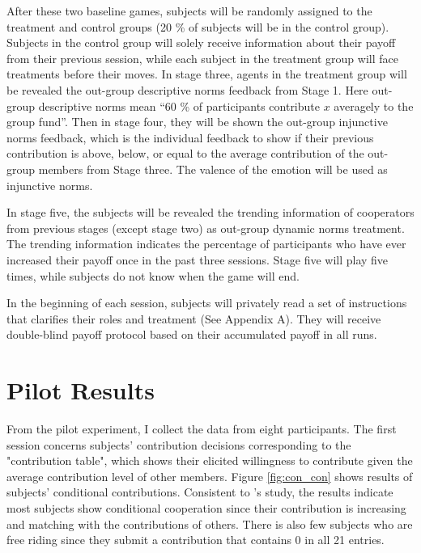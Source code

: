 \documentclass[12pt]{article}
\begin{document}
After these two baseline games, subjects will be randomly assigned to the treatment and control groups (20 \% of subjects will be in the control group). Subjects in the control group will solely receive information about their payoff from their previous session, while each subject in the treatment group will face treatments before their moves. In stage three, agents in the treatment group will be revealed the out-group descriptive norms feedback from Stage 1. Here out-group descriptive norms mean “60 \% of participants contribute $x$ averagely to the group fund”. Then in stage four, they will be shown the out-group injunctive norms feedback, which is the individual feedback to show if their previous contribution is above, below, or equal to the average contribution of the out-group members from Stage three. The valence of the emotion will be used as injunctive norms. 

In stage five, the subjects will be revealed the trending information of cooperators from previous stages (except stage two) as out-group dynamic norms treatment. The trending information indicates the percentage of participants who have ever increased their payoff once in the past three sessions. Stage five will play five times, while subjects do not know when the game will end. 

In the beginning of each session, subjects will privately read a set of instructions that clarifies their roles and treatment (See Appendix A). They will receive double-blind payoff protocol based on their accumulated payoff in all runs. 

\section{Pilot Results}

From the pilot experiment, I collect the data from eight participants. The first session concerns subjects' contribution decisions corresponding to the "contribution table", which shows their elicited willingness to contribute given the average contribution level of other members. Figure \ref{fig:con_con} shows results of subjects' conditional contributions. Consistent to \cite{fischbacher2001people}'s study, the results indicate most subjects show conditional cooperation since their contribution is increasing and matching with the contributions of others. There is also few subjects who are free riding since they submit a contribution that contains 0 in all 21 entries. 
\end{document}
